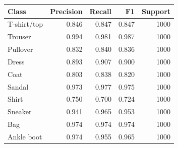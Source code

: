 \begin{tabular}{lrrrr}
\toprule
Class & Precision & Recall & F1 & Support \\
\midrule
T-shirt/top & 0.846 & 0.847 & 0.847 & 1000 \\
Trouser & 0.994 & 0.981 & 0.987 & 1000 \\
Pullover & 0.832 & 0.840 & 0.836 & 1000 \\
Dress & 0.893 & 0.907 & 0.900 & 1000 \\
Coat & 0.803 & 0.838 & 0.820 & 1000 \\
Sandal & 0.973 & 0.977 & 0.975 & 1000 \\
Shirt & 0.750 & 0.700 & 0.724 & 1000 \\
Sneaker & 0.941 & 0.965 & 0.953 & 1000 \\
Bag & 0.974 & 0.974 & 0.974 & 1000 \\
Ankle boot & 0.974 & 0.955 & 0.965 & 1000 \\
\bottomrule
\end{tabular}
